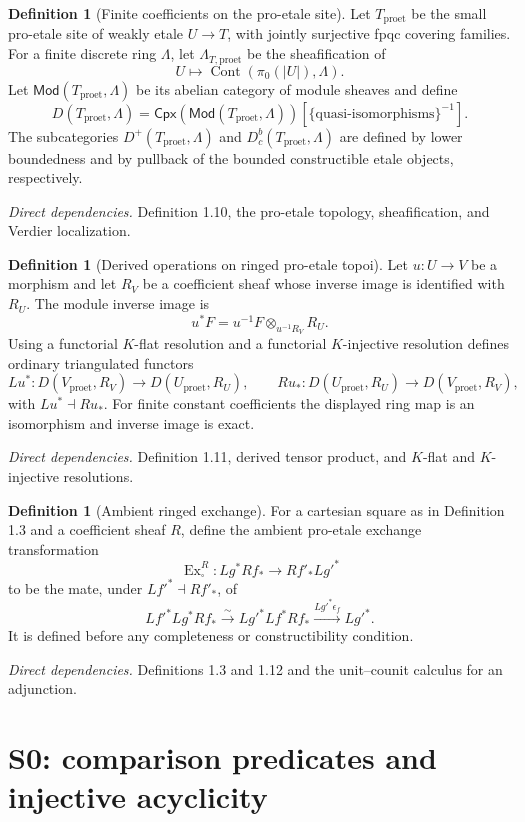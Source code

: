 \documentclass[10pt]{article}
\theoremstyle{definition}
\newtheorem{definition}[theorem]{Definition}
\newcommand{\Mod}{\mathsf{Mod}}
\newcommand{\Dbc}{D^b_c}
\newcommand{\Dplus}{D^+}
\newcommand{\Proet}{\mathrm{proet}}
\newcommand{\Ex}{\operatorname{Ex}}
\newcommand{\deps}[1]{\par\smallskip\textit{Direct dependencies.} #1\par}
\begin{document}
\begin{definition}[Finite coefficients on the pro-etale site]
Let $T_{\Proet}$ be the small pro-etale site of weakly etale
$U\to T$, with jointly surjective fpqc covering families.  For a finite
discrete ring $\Lambda$, let $\Lambda_{T,\Proet}$ be the sheafification of
\[
 U\longmapsto\operatorname{Cont}(\pi_0(|U|),\Lambda).
\]
Let $\Mod(T_{\Proet},\Lambda)$ be its abelian category of module sheaves and
define
\[
 D(T_{\Proet},\Lambda)=
 \mathsf{Cpx}(\Mod(T_{\Proet},\Lambda))
 [\{\text{quasi-isomorphisms}\}^{-1}].
\]
The subcategories $\Dplus(T_{\Proet},\Lambda)$ and
$\Dbc(T_{\Proet},\Lambda)$ are defined by lower boundedness and by pullback
of the bounded constructible etale objects, respectively.
\end{definition}
\deps{Definition 1.10, the pro-etale topology, sheafification, and Verdier
localization.}

\begin{definition}[Derived operations on ringed pro-etale topoi]
Let $u:U\to V$ be a morphism and let $R_V$ be a coefficient sheaf whose
inverse image is identified with $R_U$.  The module inverse image is
\[
 u^*F=u^{-1}F\otimes_{u^{-1}R_V}R_U.
\]
Using a functorial $K$-flat resolution and a functorial $K$-injective
resolution defines ordinary triangulated functors
\[
 Lu^*:D(V_{\Proet},R_V)\longrightarrow D(U_{\Proet},R_U),
 \qquad
 Ru_*:D(U_{\Proet},R_U)\longrightarrow D(V_{\Proet},R_V),
\]
with $Lu^*\dashv Ru_*$.  For finite constant coefficients the displayed
ring map is an isomorphism and inverse image is exact.
\end{definition}
\deps{Definition 1.11, derived tensor product, and $K$-flat and
$K$-injective resolutions.}

\begin{definition}[Ambient ringed exchange]
For a cartesian square as in Definition 1.3 and a coefficient sheaf $R$,
define the ambient pro-etale exchange transformation
\[
 \Ex^R_{\square}:Lg^*Rf_*\longrightarrow Rf'_*Lg'^*
\]
to be the mate, under $Lf'^*\dashv Rf'_*$, of
\[
 Lf'^*Lg^*Rf_*\xrightarrow{\sim}
 Lg'^*Lf^*Rf_*\xrightarrow{Lg'^*\epsilon_f}Lg'^*.
\]
It is defined before any completeness or constructibility condition.
\end{definition}
\deps{Definitions 1.3 and 1.12 and the unit--counit calculus for an
adjunction.}

\section{S0: comparison predicates and injective acyclicity}
\end{document}
